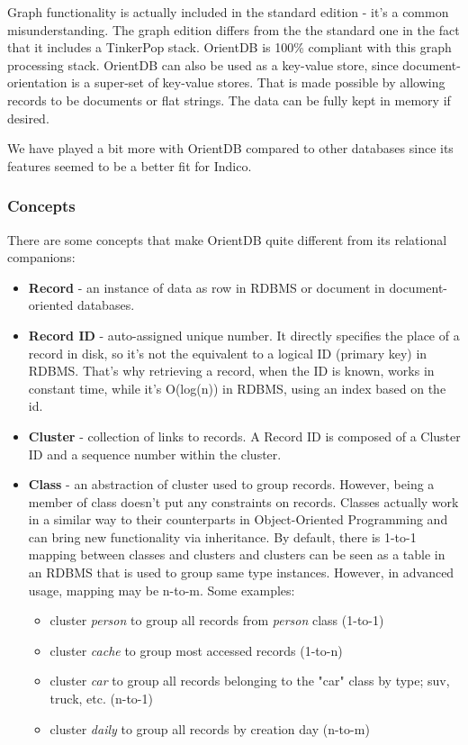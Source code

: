 Graph functionality is actually included in the standard edition - it's a common misunderstanding. The graph edition differs from the the standard one in the fact that it includes a TinkerPop stack. OrientDB is 100\% compliant with this graph processing stack. OrientDB can also be used as a key-value store, since document-orientation is a super-set of key-value stores. That is made possible by allowing records to be documents or flat strings. The data can be fully kept in memory if desired.

We have played a bit more with OrientDB compared to other databases since its features seemed to be a better fit for Indico.

\subsubsection*{Concepts}

There are some concepts that make OrientDB quite different from its relational companions:

\begin{itemize}
  \item \textbf{Record} - an instance of data as row in RDBMS or document in document-oriented databases.
  \item \textbf{Record ID} - auto-assigned unique number. It directly specifies the place of a record in disk, so it's not the equivalent to a logical ID (primary key) in RDBMS. That's why retrieving a record, when the ID is known, works in constant time, while it's O(log(n)) in RDBMS, using an index based on the id.
  \item \textbf{Cluster} - collection of links to records. A Record ID is composed of a Cluster ID and a sequence number within the cluster.
  \item \textbf{Class} - an abstraction of cluster used to group records. However, being a member of class doesn't put any constraints on records. Classes actually work in a similar way to their counterparts in Object-Oriented Programming and can bring new functionality via inheritance. By default, there is 1-to-1 mapping between classes and clusters and clusters can be seen as a table in an RDBMS that is used to group same type instances. However, in advanced usage, mapping may be n-to-m. Some examples:
  \begin{itemize}
	\item cluster \textit{person} to group all records from \textit{person} class (1-to-1)
	\item cluster \textit{cache} to group most accessed records (1-to-n)
	\item cluster \textit{car} to group all records belonging to the "car" class by type; suv, truck, etc. (n-to-1)
	\item cluster \textit{daily} to group all records by creation day (n-to-m)
  \end{itemize}
\end{itemize}

